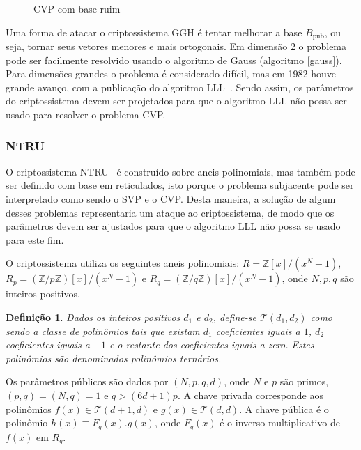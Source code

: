 \documentclass{SBCbookchapter}
\newtheorem{definition}{Definição}{\bfseries}{\itshape}
\begin{document}
\begin{otherlanguage}{brazilian}
\begin{figure}[h]
\begin{center}
\caption{CVP com base ruim}
\label{figbase}
\end{center}
\end{figure}

Uma forma de atacar o criptossistema GGH é tentar melhorar a base $B_\mathrm{pub}$, ou seja, tornar seus vetores menores e mais ortogonais. Em dimensão 2 o problema pode ser facilmente resolvido usando o algoritmo de Gauss (algoritmo \ref{gauss}). Para dimensões grandes o problema é considerado difícil, mas em 1982 houve grande avanço, com a publicação do algoritmo LLL~\cite{LLL}. Sendo assim, os parâmetros do criptossistema devem ser projetados para que o algoritmo LLL não possa ser usado para resolver o problema CVP.


\subsubsection{NTRU}

O criptossistema NTRU~\cite{NTRU} é construído sobre aneis polinomiais, mas também pode ser definido com base em reticulados, isto porque o problema subjacente pode ser interpretado como sendo o SVP e o CVP. Desta maneira, a solução de algum desses problemas representaria um ataque ao criptossistema, de modo que os parâmetros devem ser ajustados para que o algoritmo LLL não possa se usado para este fim.

O criptossistema utiliza os seguintes aneis polinomiais: $R = \mathbb{Z}[x]/(x^N-1)$, $R_p = (\mathbb{Z}/p\mathbb{Z})[x]/(x^N-1)$ e $R_q = (\mathbb{Z}/q\mathbb{Z})[x]/(x^N-1)$, onde $N, p, q$ são inteiros positivos. 
 
\begin{definition}
Dados os inteiros positivos $d_1$ e $d_2$, define-se $\mathcal{T}(d_1, d_2)$ como sendo a classe de polinômios tais que existam $d_1$ coeficientes iguais a $1$, $d_2$ coeficientes iguais a $-1$ e o restante dos coeficientes iguais a zero. Estes polinômios são denominados \emph{polinômios ternários}.
\end{definition}

Os parâmetros públicos são dados por $(N, p, q, d)$, onde $N$ e $p$ são primos, $(p, q) = (N, q) = 1$ e $q > (6d+1)p$. A chave privada corresponde aos polinômios $f(x) \in \mathcal{T}(d+1,d)$ e $g(x) \in \mathcal{T}(d,d)$. A chave pública é o polinômio $h(x) \equiv F_q(x).g(x)$, onde $F_q(x)$ é o inverso multiplicativo de $f(x)$ em $R_q$.


\end{otherlanguage}
\end{document}
